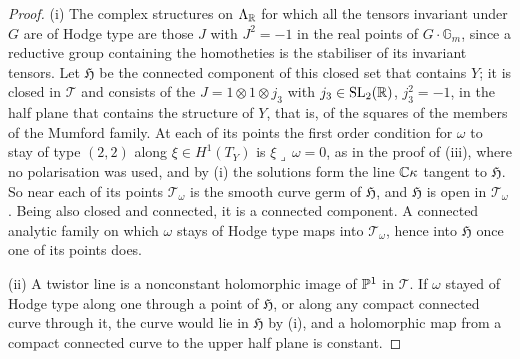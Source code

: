 \begin{proof}
(i) The complex structures on $\Lambda_{\mathbb{R}}$ for which all the tensors
invariant under $G$ are of Hodge type are those $J$ with $J^{2}=-1$ in the
real points of $G\cdot\mathbb{G}_{m}$, since a reductive group containing the
homotheties is the stabiliser of its invariant tensors. Let $\mathfrak{H}$ be
the connected component of this closed set that contains $Y$; it is closed in
$\mathcal{T}$ and consists of the $J=1\otimes1\otimes j_{3}$ with
$j_{3}\in\operatorname{SL}_{2}(\mathbb{R})$, $j_{3}^{2}=-1$, in the half plane that contains the
structure of $Y$, that is, of the squares of the members of the Mumford
family. At each of its points the first order condition for $\omega$ to stay
of type $(2,2)$ along $\xi\in H^{1}(T_{Y})$ is $\xi\lrcorner\,\omega=0$, as
in the proof of
(iii), where no polarisation was used, and by
(i) the solutions form the line $\mathbb{C}\kappa$ tangent to
$\mathfrak{H}$. So near each of its points $\mathcal{T}_{\omega}$ is the smooth
curve germ of $\mathfrak{H}$, and $\mathfrak{H}$ is open in
$\mathcal{T}_{\omega}$. Being also closed and connected, it is a connected
component. A connected analytic family on which $\omega$ stays of Hodge type
maps into $\mathcal{T}_{\omega}$, hence into $\mathfrak{H}$ once one of its
points does.

(ii) A twistor line is a nonconstant holomorphic image of $\mathbb{P}^{1}$ in
$\mathcal{T}$. If $\omega$ stayed of Hodge type along one through a point of
$\mathfrak{H}$, or along any compact connected curve through it, the curve
would lie in $\mathfrak{H}$ by (i), and a holomorphic map from a compact
connected curve to the upper half plane is constant.


\end{proof}
